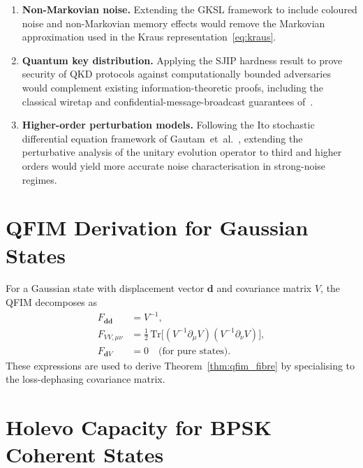 \documentclass[journal,twocolumn]{IEEEtran}
\theoremstyle{definition}
\theoremstyle{plain}
\newcommand{\Tr}{\mathrm{Tr}}
\begin{document}
\begin{enumerate}[leftmargin=*, label=(\arabic*), itemsep=2pt]
  \item \textbf{Non-Markovian noise.}  Extending the GKSL framework
    to include coloured noise and non-Markovian memory effects would
    remove the Markovian approximation used in the Kraus
    representation~\eqref{eq:kraus}.

  \item \textbf{Quantum key distribution.}  Applying the
    SJIP hardness result to prove security of QKD protocols against
    computationally bounded adversaries would complement existing
    information-theoretic proofs, including the classical wiretap
    and confidential-message-broadcast guarantees
    of~\cite{wyner1975,csiszarkorner1978}.

  \item \textbf{Higher-order perturbation models.}  Following
    the Ito stochastic differential equation framework of
    Gautam~et~al.~\cite{gautam2015a}, extending the perturbative
    analysis of the unitary evolution operator to third and higher
    orders would yield more accurate noise characterisation in
    strong-noise regimes.
\end{enumerate}

\appendices

\section{QFIM Derivation for Gaussian States}
\label{app:qfim}

For a Gaussian state with displacement vector $\mathbf{d}$ and
covariance matrix $V$, the QFIM decomposes as
\begin{align}
  F_{\mathbf{d}\mathbf{d}} &= V^{-1}, \label{eq:Fdd}\\
  F_{VV,\mu\nu} &= \tfrac{1}{2}\,\Tr\!\bigl[(V^{-1}\partial_\mu V)
    (V^{-1}\partial_\nu V)\bigr], \label{eq:FVV}\\
  F_{\mathbf{d}V} &= 0 \quad \text{(for pure states)}. \label{eq:FdV}
\end{align}
These expressions are used to derive Theorem~\ref{thm:qfim_fibre} by
specialising to the loss-dephasing covariance matrix.

\section{Holevo Capacity for BPSK Coherent States}
\label{app:holevo_bpsk}
\end{document}
